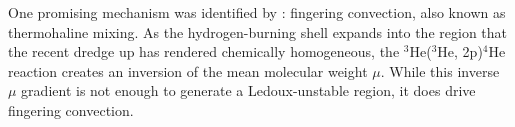 One promising mechanism was identified by \citet{charbonnel_thermohaline_2007}: fingering convection, also known as thermohaline mixing. As the hydrogen-burning shell expands into the region that the recent dredge up has rendered chemically homogeneous, the $^3$He($^3$He, 2p)$^4$He reaction creates an inversion of the mean molecular weight $\mu$. While this inverse $\mu$ gradient is not enough to generate a Ledoux-unstable region, it does drive fingering convection. 


